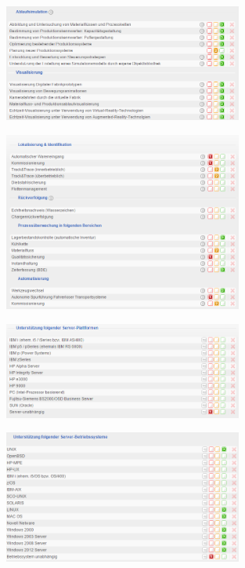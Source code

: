\documentclass[12pt]{article}
\begin{document}
\noindent
\begin{figure}[!h]
\centering
\includegraphics[width=0.7\textwidth]{images/tr45}
\end{figure}\FloatBarrier
\noindent
\begin{figure}[!h]
\centering
\includegraphics[width=0.7\textwidth]{images/tr46}
\end{figure}\FloatBarrier
\noindent
\begin{figure}[!h]
\centering
\includegraphics[width=0.7\textwidth]{images/tr47}
\end{figure}\FloatBarrier
\noindent
\begin{figure}[!h]
\centering
\includegraphics[width=0.7\textwidth]{images/tr48}
\end{figure}\FloatBarrier
\end{document}
